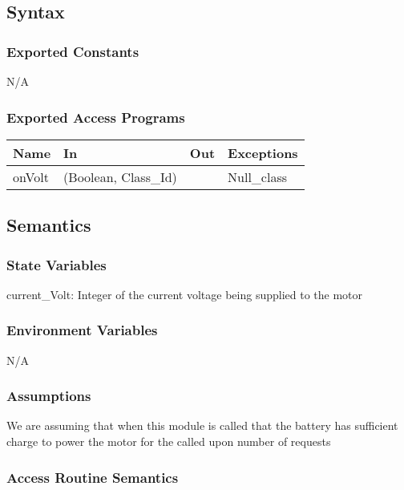 \documentclass[12pt, titlepage]{article}
\begin{document}
\subsection{Syntax}

\subsubsection{Exported Constants}
N/A

\subsubsection{Exported Access Programs}

\begin{center}
\begin{tabular}{p{4cm} p{4cm} p{4cm} p{4cm}}
\hline
\textbf{Name} & \textbf{In} & \textbf{Out} & \textbf{Exceptions} \\
\hline
onVolt & (Boolean, Class\_Id) &  & Null\_class\\
\hline
\end{tabular}
\end{center}

\subsection{Semantics}

\subsubsection{State Variables}

current\_Volt: Integer of the current voltage being supplied to the motor

\subsubsection{Environment Variables}

N/A

\subsubsection{Assumptions}

We are assuming that when this module is called that the battery has sufficient charge to power the motor for the called upon number of requests

\subsubsection{Access Routine Semantics}
\end{document}
